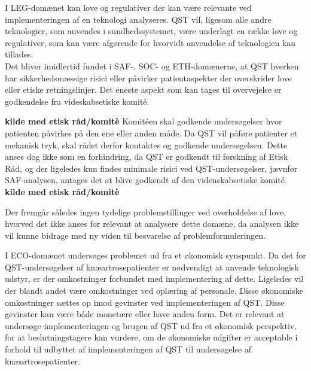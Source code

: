 I LEG-domænet kan love og regulativer der kan være relevante ved implementeringen af en teknologi analyseres. QST vil, ligesom alle andre teknologier, som anvendes i sundhedssystemet, være underlagt en række love og regulativer, som kan være afgørende for hvorvidt anvendelse af teknologien kan tillades.\\ 
Det bliver imidlertid fundet i SAF-, SOC- og ETH-domænerne, at QST hverken har sikkerhedsmæssige risici eller påvirker patientaspekter der overskrider love eller etiske retningslinjer. Det eneste aspekt som kan tages til overvejelse er godkendelse fra videskabsetiske komité. 

\textbf{kilde med etisk råd/komitè}
Komitéen skal godkende undersøgelser hvor patienten påvirkes på den ene eller anden måde. Da QST vil påføre patienter et mekanisk tryk, skal rådet derfor kontaktes og godkende undersøgelsen. Dette anses dog ikke som en forhindring, da QST er godkendt til forskning af Etisk Råd, og der ligeledes kun findes minimale risici ved QST-undersøgelser, jævnfør SAF-analysen, antages det at blive godkendt af den videnskabsetiske komité. 
\textbf{kilde med etisk råd/komitè}

Der fremgår således ingen tydelige problemstillinger ved overholdelse af love, hvorved det ikke anses for relevant at analysere dette domæne, da analysen ikke vil kunne bidrage med ny viden til besvarelse af problemformuleringen.

I ECO-domænet undersøges problemet ud fra et økonomisk synspunkt. Da det for QST-undersøgelser af knæartrosepatienter er nødvendigt at anvende teknologisk udstyr, er der omkostninger forbundet med implementering af dette. Ligeledes vil der blandt andet være omkostninger ved oplæring af personale. Disse økonomiske omkostninger sættes op imod gevinster ved implementeringen af QST. Disse gevinster kan være både monetære eller have anden form. Det er relevant at undersøge implementeringen og brugen af QST ud fra et økonomisk perspektiv, for at beslutningstagere kan vurdere, om de økonomiske udgifter er acceptable i forhold til udbyttet af implementeringen af QST til undersøgelse af knæartrosepatienter. 

